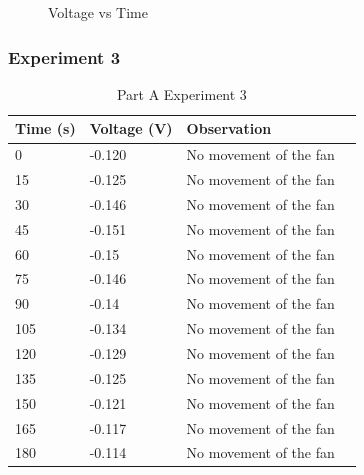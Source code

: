 \documentclass[a4paper, 12pt, english]{article}
\begin{document}
\begin{figure}[H]
	\centering
	\caption{Voltage vs Time}
	\label{fig:a2}
\end{figure}

\subsubsection{Experiment 3}

\begin{table}[H]
	\centering
	\caption{Part A Experiment 3}
	\label{tab:partA3}
	\begin{tabular}{@{}llll@{}}
		\toprule
		\textbf{Time (s)} & \textbf{Voltage (V)} & \textbf{Observation}   \\ \midrule
		0                 & -0.120                    & No movement of the fan \\
		15                & -0.125               & No movement of the fan \\
		30                & -0.146               & No movement of the fan \\
		45                & -0.151               & No movement of the fan \\
		60                & -0.15                & No movement of the fan \\
		75                & -0.146               & No movement of the fan \\
		90                & -0.14                & No movement of the fan \\
		105               & -0.134               & No movement of the fan \\
		120               & -0.129               & No movement of the fan \\
		135               & -0.125               & No movement of the fan \\
		150               & -0.121               & No movement of the fan \\
		165               & -0.117               & No movement of the fan \\
		180               & -0.114               & No movement of the fan \\ \bottomrule
	\end{tabular}
\end{table}
\end{document}
